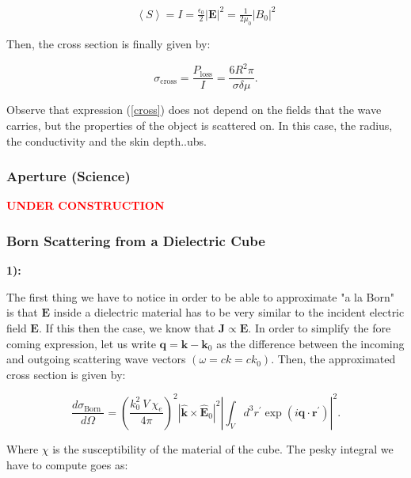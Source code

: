 \begin{equation}
	\left\langle S \right\rangle = I = \tfrac{\epsilon_{0}}{2}\left|\mathbf{E}\right|^{2} = \tfrac{1}{2\mu_{0}} \left|B_{0}\right|^{2}
\end{equation}

Then, the cross section is finally given by:

\begin{equation}\label{cross}
	\sigma_{\text{cross}} = \frac{P_{\mathrm{loss}}}{I} = \frac{6R^{2}\pi}{\sigma \delta \mu}.
\end{equation}

Observe that expression (\ref{cross}) does not depend on the fields that the wave carries, but the properties of the object is scattered on. In this case, the radius, the conductivity and the skin depth..ubs.

\subsubsection{Aperture (Science)}\label{Aperture (Science)}
\textbf{\textcolor{red}{UNDER CONSTRUCTION}}


\subsubsection{Born Scattering from a Dielectric Cube}\label{Born Scattering from a Dielectric Cube}

\textbf{1):}

The first thing we have to notice in order to be able to approximate "a la Born" is that $\mathbf{E}$ inside a dielectric material has to be very similar to the incident electric field $\mathbf{E}$. If this then the case, we know that $\mathbf{J} \propto \mathbf{E}$. In order to simplify the fore coming expression, let us write $\mathbf{q}=\mathbf{k}-\mathbf{k}_{0}$ as the difference between the incoming and outgoing scattering wave vectors $\left(\omega=c k=c k_{0}\right)$. Then, the approximated cross section is given by:

\begin{equation}
	\frac{d \sigma_{\text {Born }}}{d \Omega}=\left(\frac{k_{0}^{2}\: V\: \chi_{e}}{4 \pi}\right)^{2}\left|\hat{\mathbf{k}} \times \hat{\mathbf{E}}_{0}\right|^{2}\left|\int_{V} d^{3} r^{\prime} \exp \left(i \mathbf{q} \cdot \mathbf{r}^{\prime}\right)\right|^{2}.
\end{equation}

Where $\chi$ is the susceptibility of the material of the cube. The pesky integral we have to compute goes as:

